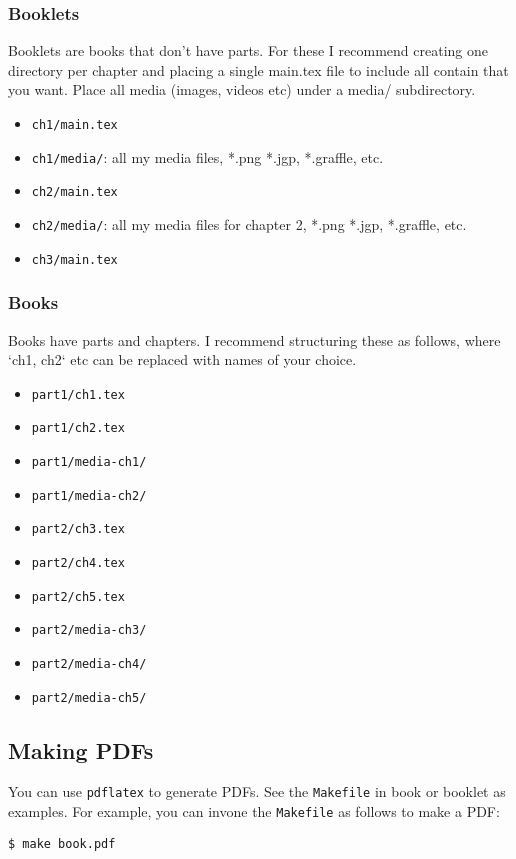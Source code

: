 \subsubsection{Booklets}
 
 Booklets are books that don't have parts. For these  I recommend creating one directory per chapter and placing a single main.tex file to include all contain that you want.  Place all media (images, videos etc) under a media/ subdirectory. 
\begin{itemize}  
\item \lstinline`ch1/main.tex`
\item \lstinline`ch1/media/`: all my media files, *.png *.jgp, *.graffle, etc.
\item \lstinline`ch2/main.tex`
\item \lstinline`ch2/media/`: all my media files for chapter 2, *.png *.jgp, *.graffle, etc.
\item \lstinline`ch3/main.tex`
\end{itemize}

\subsubsection{Books}

Books have parts and chapters. I recommend structuring these as follows, where `ch1, ch2` etc can be replaced with names of your choice.
%
\begin{itemize}
\item \lstinline`part1/ch1.tex`
\item \lstinline`part1/ch2.tex`
\item \lstinline`part1/media-ch1/`
\item \lstinline`part1/media-ch2/`
\item \lstinline`part2/ch3.tex`
\item \lstinline`part2/ch4.tex`
\item \lstinline`part2/ch5.tex`
\item \lstinline`part2/media-ch3/`
\item \lstinline`part2/media-ch4/`
\item \lstinline`part2/media-ch5/`
\end{itemize}
   
\subsection{Making PDFs}
You can use \lstinline`pdflatex` to generate PDFs.  See the \lstinline`Makefile` in book or booklet as examples.
%
For example, you can  invone the \lstinline`Makefile` as follows to make a PDF:
\begin{lstlisting}
$ make book.pdf
\end{lstlisting}

